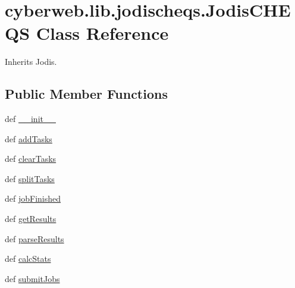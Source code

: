 \hypertarget{classcyberweb_1_1lib_1_1jodischeqs_1_1_jodis_c_h_e_q_s}{\section{cyberweb.\-lib.\-jodischeqs.\-Jodis\-C\-H\-E\-Q\-S \-Class \-Reference}
\label{classcyberweb_1_1lib_1_1jodischeqs_1_1_jodis_c_h_e_q_s}
}


\-Inherits \-Jodis.

\subsection*{\-Public \-Member \-Functions}
\begin{DoxyCompactItemize}
\item 
def \hyperlink{classcyberweb_1_1lib_1_1jodischeqs_1_1_jodis_c_h_e_q_s_a57a727fbb2ea9e1ea5b7e9ebd18672ed}{\-\_\-\-\_\-init\-\_\-\-\_\-}
\item 
def \hyperlink{classcyberweb_1_1lib_1_1jodischeqs_1_1_jodis_c_h_e_q_s_ae45f4ed0aa13d2d5bc250b02ac3aa681}{add\-Tasks}
\item 
def \hyperlink{classcyberweb_1_1lib_1_1jodischeqs_1_1_jodis_c_h_e_q_s_a0c9d3232033f67f105b48500f360a870}{clear\-Tasks}
\item 
def \hyperlink{classcyberweb_1_1lib_1_1jodischeqs_1_1_jodis_c_h_e_q_s_aeaaeade13f52d0e1678d10b9ce54a690}{split\-Tasks}
\item 
def \hyperlink{classcyberweb_1_1lib_1_1jodischeqs_1_1_jodis_c_h_e_q_s_aee03daa548bf526d45d0b69f65f7854e}{job\-Finished}
\item 
def \hyperlink{classcyberweb_1_1lib_1_1jodischeqs_1_1_jodis_c_h_e_q_s_a3f3a6da4cfcbc22481b3895b418d533a}{get\-Results}
\item 
def \hyperlink{classcyberweb_1_1lib_1_1jodischeqs_1_1_jodis_c_h_e_q_s_a1a734a142191a1a1b01ef3e258ef4428}{parse\-Results}
\item 
def \hyperlink{classcyberweb_1_1lib_1_1jodischeqs_1_1_jodis_c_h_e_q_s_a44ee8e0c059e63312213d3c24638bf1e}{calc\-Stats}
\item 
def \hyperlink{classcyberweb_1_1lib_1_1jodischeqs_1_1_jodis_c_h_e_q_s_abc5adff353bfc79929ee61993c418030}{submit\-Jobs}
\end{DoxyCompactItemize}
